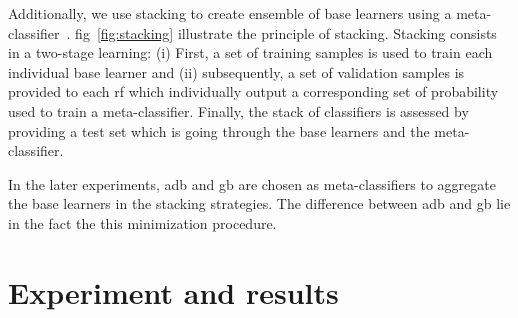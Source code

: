 \documentclass[num-refs]{wiley-article}
\begin{document}
Additionally, we use stacking to create ensemble of base learners using a meta-classifier~\cite{wolpert1992stacked}.
\Acl{fig}~\ref{fig:stacking} illustrate the principle of stacking.
Stacking consists in a two-stage learning:
(i) First, a set of training samples is used to train each individual base learner and
(ii) subsequently, a set of validation samples is provided to each \ac{rf} which individually output a corresponding set of probability used to train a meta-classifier.
Finally, the stack of classifiers is assessed by providing a test set which is going through the base learners and the meta-classifier.

In the later experiments, \ac{adb} and \ac{gb} are chosen as meta-classifiers to aggregate the base learners in the stacking strategies.
The difference between \ac{adb} and \ac{gb} lie in the fact the this
minimization procedure.

\section{Experiment and results}
\label{sec:experiments}












\end{document}
